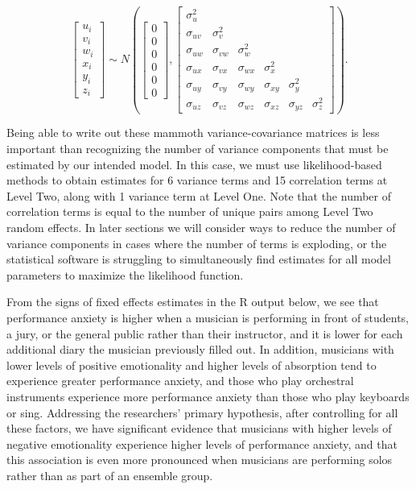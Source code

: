\documentclass[
]{krantz}
\begin{document}
\[ \left[ \begin{array}{c}
            u_{i} \\ v_{i} \\ w_{i} \\ x_{i} \\ y_{i} \\ z_{i}
          \end{array}  \right] \sim N \left( \left[
          \begin{array}{c}
            0 \\ 0 \\ 0 \\ 0 \\ 0 \\ 0
          \end{array} \right], \left[
          \begin{array}{cccccc}
            \sigma_{u}^{2} & & & & & \\
            \sigma_{uv} & \sigma_{v}^{2} & & & & \\
            \sigma_{uw} & \sigma_{vw} & \sigma_{w}^{2} & & & \\
            \sigma_{ux} & \sigma_{vx} & \sigma_{wx} & \sigma_{x}^{2} & & \\
            \sigma_{uy} & \sigma_{vy} & \sigma_{wy} & \sigma_{xy} & \sigma_{y}^{2} & \\
            \sigma_{uz} & \sigma_{vz} & \sigma_{wz} & \sigma_{xz} & \sigma_{yz} & \sigma_{z}^{2}
          \end{array} \right] \right). \]

Being able to write out these mammoth variance-covariance matrices is less important than recognizing the number of variance components that must be estimated by our intended model. In this case, we must use likelihood-based methods to obtain estimates for 6 variance terms and 15 correlation terms at Level Two, along with 1 variance term at Level One. Note that the number of correlation terms is equal to the number of unique pairs among Level Two random effects. In later sections we will consider ways to reduce the number of variance components in cases where the number of terms is exploding, or the statistical software is struggling to simultaneously find estimates for all model parameters to maximize the likelihood function.

From the signs of fixed effects estimates in the R output below, we see that performance anxiety is higher when a musician is performing in front of students, a jury, or the general public rather than their instructor, and it is lower for each additional diary the musician previously filled out. In addition, musicians with lower levels of positive emotionality and higher levels of absorption tend to experience greater performance anxiety, and those who play orchestral instruments experience more performance anxiety than those who play keyboards or sing. Addressing the researchers' primary hypothesis, after controlling for all these factors, we have significant evidence that musicians with higher levels of negative emotionality experience higher levels of performance anxiety, and that this association is even more pronounced when musicians are performing solos rather than as part of an ensemble group.
\end{document}
